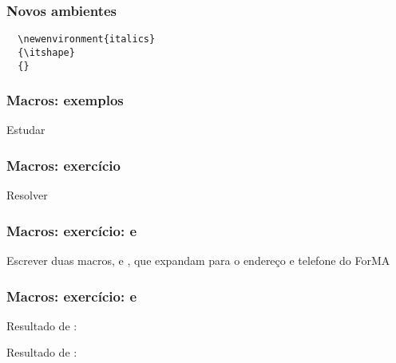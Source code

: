 \begin{frame}[fragile]
  \frametitle{Novos ambientes}
  \begin{verbatim}
  \newenvironment{italics}
  {\itshape}
  {}
  \end{verbatim}
\end{frame}

\begin{frame}
  \frametitle{Macros: exemplos}
  \huge
  Estudar 
\end{frame}

\begin{frame}
  \frametitle{Macros: exercício}
  \huge
  Resolver 
\end{frame}

\begin{frame}
  \frametitle{Macros: exercício: \latexcode{\address} e \latexcode{\telephone}}
  \LARGE
  Escrever duas macros, \latexcode{\address} e \latexcode{\telephone}, que
  expandam para o endereço e telefone do ForMA
\end{frame}

\begin{frame}
  \frametitle{Macros: exercício: \latexcode{\email} e \latexcode{\todo}}
  \LARGE
  Resultado de \latexcode{\email}: 
  \vspace{1em}

  Resultado de \latexcode{\todo}: 
\end{frame}
